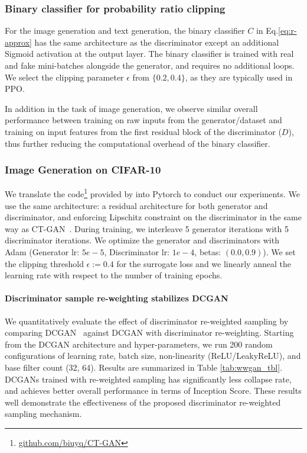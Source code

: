 \documentclass{article}
\newcommand{\0}{\bm{0}}
\begin{document}
\subsubsection{Binary classifier for probability ratio clipping}
For the image generation and text generation, the binary classifier $C$ in Eq.\eqref{eq:r-approx} has the same architecture as the discriminator except an additional Sigmoid activation at the output layer. The binary classifier is trained with real and fake mini-batches alongside the generator, and requires no additional loops. We select the clipping parameter $\epsilon$ from $\{0.2, 0.4\}$, as they are typically used in PPO.

In addition in the task of image generation, we observe similar overall performance between training on raw inputs from the generator/dataset and training on input features from the first residual block of the discriminator ($D$), thus further reducing the computational overhead of the binary classifier.


\subsubsection{Image Generation on CIFAR-10}
We translate the code\footnote{\href{https://github.com/biuyq/CT-GAN}{github.com/biuyq/CT-GAN}} provided by \citet{wwgan} into Pytorch to conduct our experiments. We use the same architecture: a residual architecture for both generator and discriminator, and enforcing Lipschitz constraint on the discriminator in the same way as CT-GAN~\cite{wwgan}. 
During training, we interleave 5 generator iterations with 5 discriminator iterations. We optimize the generator and discriminators with Adam (Generator lr: $5e-5$, Discriminator lr: $1e-4$, betas: $(0.0, 0.9)$). We set the clipping threshold $\epsilon := 0.4$ for the surrogate loss and we linearly anneal the learning rate with respect to the number of training epochs.


\paragraph{Discriminator sample re-weighting stabilizes DCGAN}
We quantitatively evaluate the effect of discriminator re-weighted sampling by comparing DCGAN~\cite{DCGAN} against DCGAN with discriminator re-weighting. Starting from the DCGAN architecture and hyper-parameters, we run 200 random configurations of learning rate, batch size, non-linearity (ReLU/LeakyReLU), and base filter count (32, 64). Results are summarized in Table \ref{tab:wwgan_tbl}. DCGANs trained with re-weighted sampling has significantly less collapse rate, and achieves better overall performance in terms of Inception Score. These results well demonstrate the effectiveness of the proposed discriminator re-weighted sampling mechanism.
\end{document}
